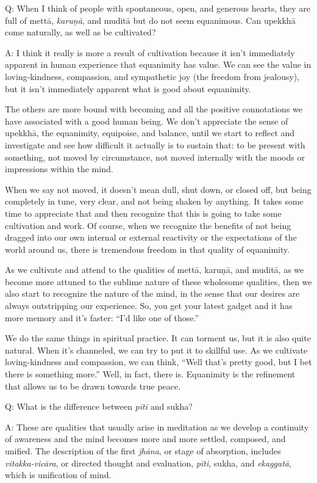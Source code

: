 \qaspace
Q: When I think of people with spontaneous, open, and generous hearts,
they are full of mettā, \emph{karuṇā}, and muditā but do not seem
equanimous. Can upekkhā come naturally, as well as be cultivated?

\qaspace
A: I think it really is more a result of cultivation because it isn’t
immediately apparent in human experience that equanimity has value. We
can see the value in loving-kindness, compassion, and sympathetic joy
(the freedom from jealousy), but it isn’t immediately apparent what is
good about equanimity.

The others are more bound with becoming and all the positive
connotations we have associated with a good human being. We don’t
appreciate the sense of upekkhā, the equanimity, equipoise, and balance,
until we start to reflect and investigate and see how difficult it
actually is to sustain that: to be present with something, not moved by
circumstance, not moved internally with the moods or impressions within
the mind.

When we say not moved, it doesn’t mean dull, shut down, or closed off,
but being completely in tune, very clear, and not being shaken by
anything. It takes some time to appreciate that and then recognize that
this is going to take some cultivation and work. Of course, when we
recognize the benefits of not being dragged into our own internal or
external reactivity or the expectations of the world around us, there is
tremendous freedom in that quality of equanimity.

As we cultivate and attend to the qualities of mettā, karuṇā, and
muditā, as we become more attuned to the sublime nature of these
wholesome qualities, then we also start to recognize the nature of the
mind, in the sense that our desires are always outstripping our
experience. So, you get your latest gadget and it has more memory and
it’s faster: “I’d like one of those.”

We do the same things in spiritual practice. It can torment us, but it
is also quite natural. When it’s channeled, we can try to put it to
skillful use. As we cultivate loving-kindness and compassion, we can
think, “Well that’s pretty good, but I bet there is something more.”
Well, in fact, there is. Equanimity is the refinement that allows us to
be drawn towards true peace.

\qaspace
Q: What is the difference between \emph{pīti} and sukha?

\qaspace
A: These are qualities that usually arise in meditation as we develop a
continuity of awareness and the mind becomes more and more settled,
composed, and unified. The description of the first \emph{jhāna}, or
stage of absorption, includes \emph{vitakka-vicāra}, or directed thought
and evaluation, \emph{pīti}, sukha, and \emph{ekaggatā}, which is
unification of mind.


